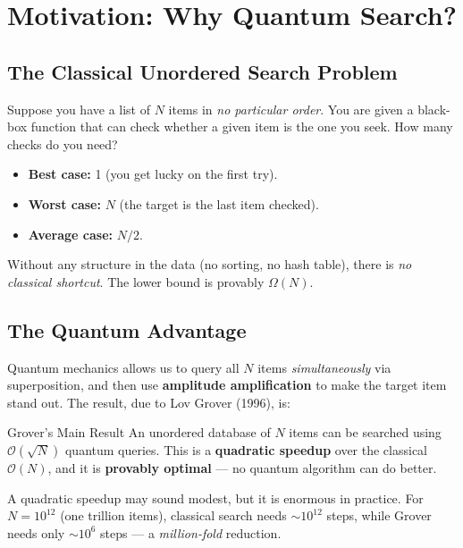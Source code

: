 \documentclass[12pt,a4paper]{article}
\newcommand{\Order}[1]{\mathcal{O}\!\left(#1\right)}
\begin{document}
\tableofcontents
\newpage

\section{Motivation: Why Quantum Search?}
\label{sec:motivation}

\subsection{The Classical Unordered Search Problem}

Suppose you have a list of $N$ items in \emph{no particular order}. You are given a black-box function that can check whether a given item is the one you seek. How many checks do you need?

\begin{itemize}
  \item \textbf{Best case:} 1 (you get lucky on the first try).
  \item \textbf{Worst case:} $N$ (the target is the last item checked).
  \item \textbf{Average case:} $N/2$.
\end{itemize}

Without any structure in the data (no sorting, no hash table), there is \emph{no classical shortcut}. The lower bound is provably $\Omega(N)$.

\subsection{The Quantum Advantage}

Quantum mechanics allows us to query all $N$ items \emph{simultaneously} via superposition, and then use \textbf{amplitude amplification} to make the target item stand out. The result, due to Lov Grover (1996), is:

\begin{thmbox}{Grover's Main Result}
An unordered database of $N$ items can be searched using $\Order{\sqrt{N}}$ quantum queries. This is a \textbf{quadratic speedup} over the classical $\Order{N}$, and it is \textbf{provably optimal} — no quantum algorithm can do better.
\end{thmbox}

\begin{notebox}
A quadratic speedup may sound modest, but it is enormous in practice. For $N = 10^{12}$ (one trillion items), classical search needs $\sim 10^{12}$ steps, while Grover needs only $\sim 10^6$ steps — a \emph{million-fold} reduction.
\end{notebox}
\end{document}
